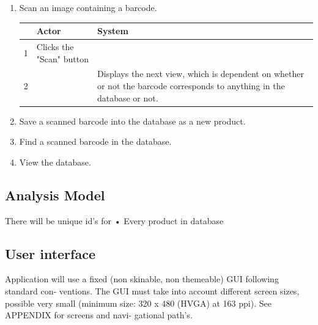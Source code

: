 \documentclass{report}
\begin{document}
\begin{enumerate}
  \item Scan an image containing a barcode.
    \begin{tabular}{ | l | l | p{3cm} |}
    \hline
      & Actor & System \\ \hline
    1 & Clicks the "Scan" button & \\ \hline
    2 & & Displays the next view, which is dependent on whether or not the barcode corresponds to anything in the database or not. \\
    \hline
    \end{tabular}
  \item Save a scanned barcode into the database as a new product.
  \item Find a scanned barcode in the database.
  \item View the database.
\end{enumerate}

\subsection{Analysis Model}

There will be unique id's for
• Every product in database

\subsection{User interface}
Application will use a fixed (non skinable, non themeable) GUI following standard con- ventions. The GUI must take into account different screen sizes, possible very small (minimum size: 320 x 480 (HVGA) at 163 ppi). See APPENDIX for screens and navi- gational path's.





\appendix
\end{document}
